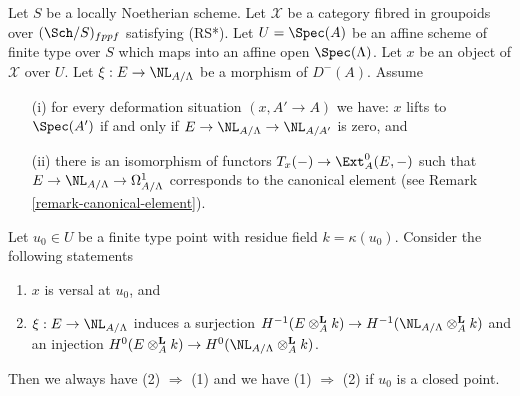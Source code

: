 \begin{lemma}
\label{lemma-characterize-versal}
Let $S$ be a locally Noetherian scheme. Let $\mathcal{X}$ be a category
fibred in groupoids over $(\Sch/S)_{fppf}$ satisfying (RS*).
Let $U = \Spec(A)$ be an
affine scheme of finite type over $S$ which maps into an affine open
$\Spec(\Lambda)$. Let $x$ be an object of $\mathcal{X}$ over $U$.
Let $\xi : E \to \NL_{A/\Lambda}$ be a morphism of $D^{-}(A)$. Assume
\begin{enumerate}
\item[(i)] for every deformation situation $(x, A' \to A)$ we have:
$x$ lifts to $\Spec(A')$ if and only if
$E \to \NL_{A/\Lambda} \to \NL_{A/A'}$ is zero, and
\item[(ii)] there is an isomorphism of functors
$T_x(-) \to \Ext^0_A(E, -)$
such that $E \to \NL_{A/\Lambda} \to \Omega^1_{A/\Lambda}$
corresponds to the canonical element (see
Remark \ref{remark-canonical-element}).
\end{enumerate}
Let $u_0 \in U$ be a finite type point with residue field
$k = \kappa(u_0)$. Consider the following statements
\begin{enumerate}
\item $x$ is versal at $u_0$, and
\item $\xi : E \to \NL_{A/\Lambda}$ induces a surjection
$H^{-1}(E \otimes_A^{\mathbf{L}} k) \to
H^{-1}(\NL_{A/\Lambda} \otimes_A^{\mathbf{L}} k)$
and an injection
$H^0(E \otimes_A^{\mathbf{L}} k) \to
H^0(\NL_{A/\Lambda} \otimes_A^{\mathbf{L}} k)$.
\end{enumerate}
Then we always have (2) $\Rightarrow$ (1) and we have (1) $\Rightarrow$ (2)
if $u_0$ is a closed point.
\end{lemma}

